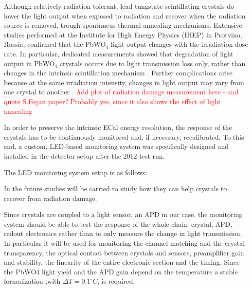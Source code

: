 Although relatively radiation tolerant, lead tungstate scintillating crystals do lower the light output when exposed to radiation and recover when the radiation source is removed, trough spontaneus thermal-annealing mechanisms. Extensive studies performed at the Institute for High Energy Physics (IHEP) in Protvino, Russia, confirmed that the PbWO$_4$ light output changes with the irradiation dose rate. In particular, dedicated measurements showed that degradation of light output in PbWO$_4$ crystals occurs due to light transmission loss only, rather than changes in the intrinsic scintillation mechanism \cite{1}. Further complications arise because at the same irradiation intensity, changes in light output may vary from one crystal to another \cite{2} \cite{3}. \textcolor{red}{Add plot of radiation damage measurement here - and quote S.Fegan paper? Probably yes, since it also shows the effect of light annealing}

In order to preserve the intrinsic ECal energy resolution, the response of the crystals has to  be continuously monitored and, if necessary, recalibrated. To this end, a custom, LED-based monitoring system was specifically designed and installed in the detector setup after the 2012 test run.


The LED monitoring system setup is as follows:

In the future studies
will be carried to study how they can help crystals to recover from radiation
damage.


Since crystals are coupled to a light sensor, an APD in our case, the monitoring system should be able to test the response of the whole chain: crystal, APD, redout electronics
rather than to only measure the change in light transmission. In particular it will be used for monitoring the channel matching and the crystal transparency, the optical contact between crystals and sensors, preamplifier gain and stability, the linearity of the entire electronic section and the timing.
Since the PbWO4 light yield and the APD gain depend on the temperature a stable formalization ,with $\Delta T=0.1^\circ C$, is required.

